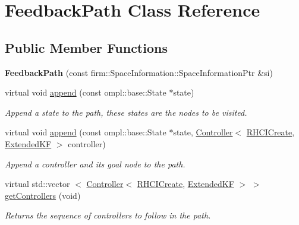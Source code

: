 \hypertarget{class_feedback_path}{\section{\-Feedback\-Path \-Class \-Reference}
\label{class_feedback_path}
}
\subsection*{\-Public \-Member \-Functions}
\begin{DoxyCompactItemize}
\item 
\hypertarget{class_feedback_path_aac87c9c760ee3583c7a79bc964b3a156}{{\bfseries \-Feedback\-Path} (const firm\-::\-Space\-Information\-::\-Space\-Information\-Ptr \&si)}\label{class_feedback_path_aac87c9c760ee3583c7a79bc964b3a156}

\item 
\hypertarget{class_feedback_path_a5ccf91587a1e62d1237db427e1fe9419}{virtual void \hyperlink{class_feedback_path_a5ccf91587a1e62d1237db427e1fe9419}{append} (const ompl\-::base\-::\-State $\ast$state)}\label{class_feedback_path_a5ccf91587a1e62d1237db427e1fe9419}

\begin{DoxyCompactList}\small\item\em \-Append a state to the path, these states are the nodes to be visited. \end{DoxyCompactList}\item 
\hypertarget{class_feedback_path_a80ea993f1c341ab15985e820b00997bc}{virtual void \hyperlink{class_feedback_path_a80ea993f1c341ab15985e820b00997bc}{append} (const ompl\-::base\-::\-State $\ast$state, \hyperlink{class_controller}{\-Controller}$<$ \hyperlink{class_r_h_c_i_create}{\-R\-H\-C\-I\-Create}, \hyperlink{class_extended_k_f}{\-Extended\-K\-F} $>$ controller)}\label{class_feedback_path_a80ea993f1c341ab15985e820b00997bc}

\begin{DoxyCompactList}\small\item\em \-Append a controller and its goal node to the path. \end{DoxyCompactList}\item 
\hypertarget{class_feedback_path_a036ec9e8dffad9b2c99401b4e54adc64}{virtual std\-::vector\*
$<$ \hyperlink{class_controller}{\-Controller}$<$ \hyperlink{class_r_h_c_i_create}{\-R\-H\-C\-I\-Create}, \*
\hyperlink{class_extended_k_f}{\-Extended\-K\-F} $>$ $>$ \hyperlink{class_feedback_path_a036ec9e8dffad9b2c99401b4e54adc64}{get\-Controllers} (void)}\label{class_feedback_path_a036ec9e8dffad9b2c99401b4e54adc64}

\begin{DoxyCompactList}\small\item\em \-Returns the sequence of controllers to follow in the path. \end{DoxyCompactList}\end{DoxyCompactItemize}
